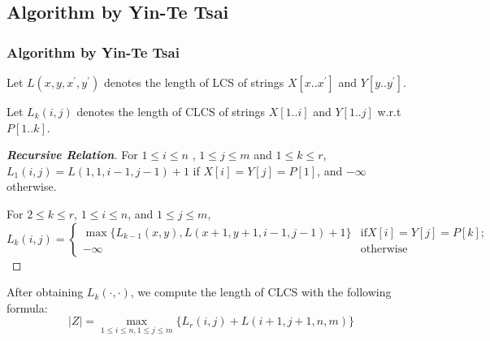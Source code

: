 \documentclass[10pt]{beamer}
\begin{document}
\subsection{Algorithm by Yin-Te Tsai}
\begin{frame}
  \frametitle{Algorithm by Yin-Te Tsai}
  Let $L(x, y, x^{\prime}, y^{\prime})$ denotes the length of LCS of strings $X[x..x^{\prime}]$ and $Y[y..y^{\prime}]$.

  Let $L_k (i, j )$ denotes the length of  CLCS of strings $X[1..i]$ and $Y[1..j ]$ w.r.t $P[1..k]$.

  \pause
\begin{proof}[\textbf{Recursive Relation}]
  For  $1\le i \le n$ , $1\le j\le m$ and $1\le k \le r$, $L_1(i, j ) = L(1, 1, i -1, j -1)+1$ if $X[i] = Y[j] = P[1]$, and $-\infty$ otherwise. 

  For $2\le k \le r$, $1\le i \le n$, and $1\le j \le m$, 
  {\footnotesize{
      \begin{equation}\label{eq:Lk}
        L_k(i, j) = \left\{
	\begin{array}{ll}
	  \max\{L_{k-1}(x,y), L(x+1, y+1, i-1, j-1) + 1\} & \textrm{if} X[i]=Y[j]=P[k];\\
          -\infty & \textrm{otherwise}
	\end{array}
	\right. 
      \end{equation}
    }
  }
\end{proof}

  \pause
  After obtaining $L_k(\cdot, \cdot)$, we compute the length of CLCS with the following formula:
  \begin{equation}\label{eq:z}
    |Z| = \max_{1\le i\le n, 1\le j\le m} \{L_r(i, j) + L(i+1, j+1, n, m) \}
  \end{equation}

\end{frame}
\end{document}
